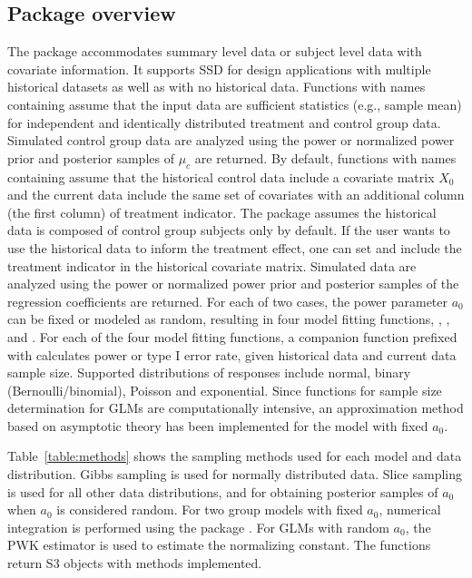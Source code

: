 \subsection*{Package overview}
The  package accommodates summary level data or subject level data with covariate information. It supports SSD for design applications with multiple historical datasets as well as with no historical data. Functions with names containing  assume that the input data are sufficient statistics (e.g., sample mean) for independent and identically distributed treatment and control group data. Simulated control group data are analyzed using the power or normalized power prior and posterior samples of $\mu_c$ are returned. By default, functions with names containing  assume that the historical control data include a covariate matrix $X_0$ and the current data include the same set of covariates with an additional column (the first column) of treatment indicator. The package assumes the historical data is composed of control group subjects only by default. If the user wants to use the historical data to inform the treatment effect, one can set  and include the treatment indicator in the historical covariate matrix. 
Simulated data are analyzed using the power or normalized power prior and posterior samples of the regression coefficients are returned. For each of two cases, the power parameter $a_0$ can be fixed or modeled as random, resulting in four model fitting functions, , ,  and . For each of the four model fitting functions, a companion function prefixed with  calculates power or type I error rate, given historical data and current data sample size. Supported distributions of responses include normal, binary (Bernoulli/binomial), Poisson and exponential. Since functions for sample size determination for GLMs are computationally intensive, an approximation method based on asymptotic theory has been implemented for the model with fixed $a_0$. 

Table~\ref{table:methods} shows the sampling methods used for each model and data distribution. Gibbs sampling is used for normally distributed data. Slice sampling \citep{slice} is used for all other data distributions, and for obtaining posterior samples of $a_0$ when $a_0$ is considered random. For two group models with fixed $a_0$, numerical integration is performed using the  package \citep{rcppnum}. For GLMs with random $a_0$, the PWK estimator \citep{pwk_2018} is used to estimate the normalizing constant. The functions return S3 objects with  methods implemented.

